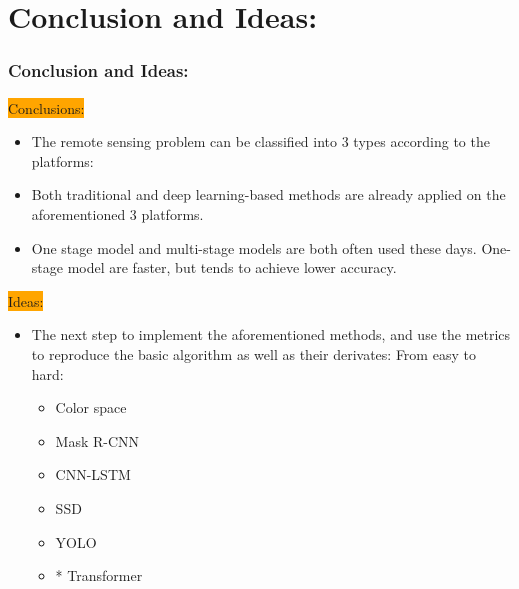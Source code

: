 \section{Conclusion and Ideas:}
\begin{frame}
    \frametitle{Conclusion and Ideas:}

    \colorbox{orange}{\Large Conclusions:}
    \normalsize
    \begin{itemize}
        \item The remote sensing problem can be classified into 3 types
            according to the platforms:
        \item Both traditional and deep learning-based methods are already
            applied on the aforementioned 3 platforms.
        \item One stage model and multi-stage models are both often used these
            days. One-stage model are faster, but tends to achieve lower
            accuracy.
    \end{itemize}
    \colorbox{orange}{\Large Ideas:}
    \normalsize
    \begin{itemize}
        \item The next step to implement the aforementioned methods, and use the
            metrics to reproduce the basic algorithm as well as their derivates:
            \linebreak
            From easy to hard:
            \begin{itemize}
                \item Color space
                \item Mask R-CNN
                \item CNN-LSTM
                \item SSD
                \item YOLO
                \item* Transformer
            \end{itemize}
    \end{itemize}
\end{frame}

